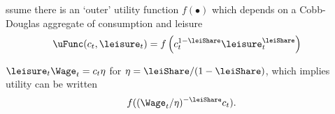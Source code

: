 ssume there is an `outer' utility function ${f}(\bullet)$ which
depends on a Cobb-Douglas aggregate of consumption and leisure
\begin{equation}\begin{gathered}\begin{aligned}
  \uFunc(c_{t},\leisure_{t}) & =  {f}\left(c_{t}^{1-\leiShare}\leisure_{t}^{\leiShare}\right)
\end{aligned}\end{gathered}\end{equation}

$\leisure_{t} \Wage_{t} = c_{t} \eta $ for $\eta=\leiShare/(1-\leiShare)$, which implies utility can be written
\begin{equation}\begin{gathered}\begin{aligned}
  {f}((\Wage_{t}/\eta)^{-\leiShare}c_{t} ).
\end{aligned}\end{gathered}\end{equation}



